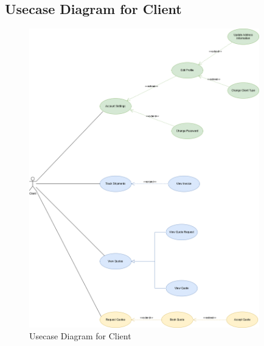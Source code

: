 \subsection{Usecase Diagram for Client}
\begin{figure}[H]
    \centering
    \includegraphics[width=10cm]{graphics/usecase/freight-flex-UC-Client.png}
    \caption{Usecase Diagram for Client}
    \label{fig:Usecase Diagram for Client}
\end{figure}

